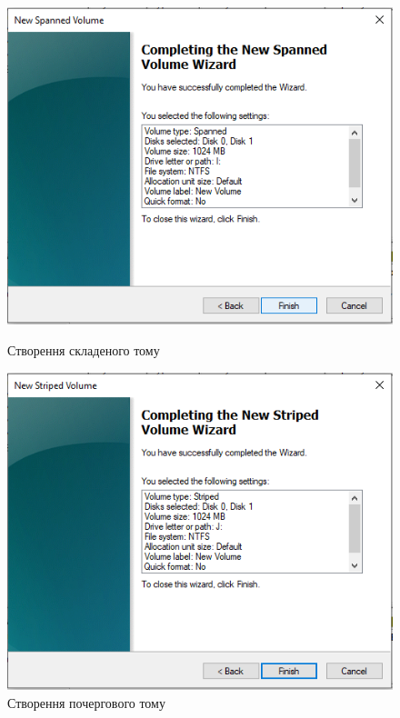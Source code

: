 \documentclass[oneside,14pt]{extarticle}
\begin{document}
\begin{normalsize}
	\begin{figure}[H]
		\centering
		\begin{minipage}{0.45\textwidth}
			\centering
			\includegraphics[scale=0.6]{14}
			\caption{Створення складеного тому}
		\end{minipage}
		\hfill
		\begin{minipage}{0.45\textwidth}
			\centering
			\includegraphics[scale=0.6]{15}
			\caption{Створення почергового тому}
		\end{minipage}
	\end{figure}
	

\end{normalsize}
\end{document}
